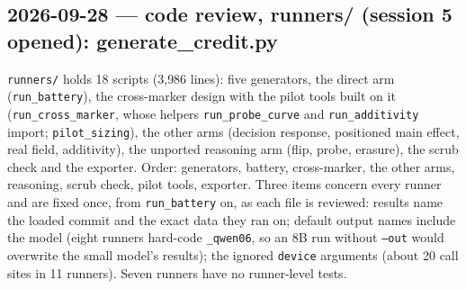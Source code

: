 \documentclass{article}
\begin{document}
\subsection*{2026-09-28 --- code review, runners/ (session 5 opened): generate\_credit.py}
\texttt{runners/} holds 18 scripts (3{,}986 lines): five generators, the direct arm (\texttt{run\_battery}), the
cross-marker design with the pilot tools built on it (\texttt{run\_cross\_marker}, whose helpers
\texttt{run\_probe\_curve} and \texttt{run\_additivity} import; \texttt{pilot\_sizing}), the other arms (decision
response, positioned main effect, real field, additivity), the unported reasoning arm (flip, probe, erasure), the
scrub check and the exporter. Order: generators, battery, cross-marker, the other arms, reasoning, scrub check,
pilot tools, exporter. Three items concern every runner and are fixed once, from \texttt{run\_battery} on, as
each file is reviewed: results name the loaded commit and the exact data they ran on; default output names
include the model (eight runners hard-code \texttt{\_qwen06}, so an 8B run without \texttt{--out} would
overwrite the small model's results); the ignored \texttt{device} arguments (about 20 call sites in 11 runners).
Seven runners have no runner-level tests.
\end{document}

